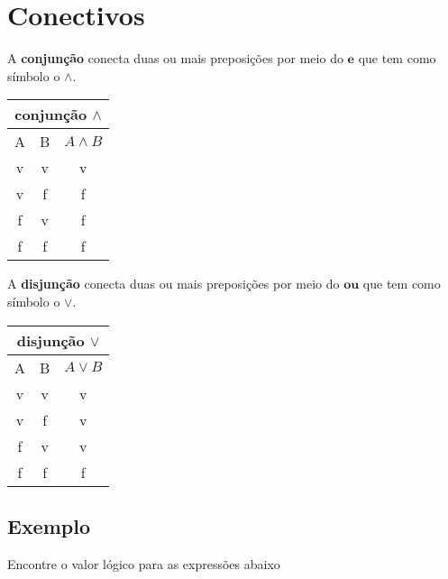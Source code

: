 \pagebreak

\section{Conectivos}

\begin{multicols}{2}
	\setlength{\columnseprule}{.5pt}
A \textbf{conjunção} conecta duas ou mais preposições por meio do $ \textbf{e} $ que tem como símbolo o $ \wedge $.\\

\begin{tabular}{|c|c|c|}
	\hline 
	\multicolumn{3}{|c|}{conjunção $ \wedge $} \\ 
	\hline 
	A	& B & $ A \wedge B $ \\ 
	\hline 
	v	& v & v \\ 
	\hline 
	v	& f & f \\ 
	\hline 
	f	& v & f \\ 
	\hline 
	f	& f & f \\ 
	\hline 
\end{tabular} 
	
	\columnbreak
		
A \textbf{disjunção} conecta duas ou mais preposições por meio do $ \textbf{ou} $ que tem como símbolo o $ \vee $.\\

\begin{tabular}{|c|c|c|}
	\hline 
	\multicolumn{3}{|c|}{disjunção $ \vee $} \\ 
	\hline 
	A	& B & $ A \vee B $ \\ 
	\hline 
	v	& v & v \\ 
	\hline 
	v	& f & v \\ 
	\hline 
	f	& v & v \\ 
	\hline 
	f	& f & f \\ 
	\hline 
\end{tabular} 

\end{multicols}

\subsection{Exemplo}
Encontre o valor lógico para as expressões abaixo

